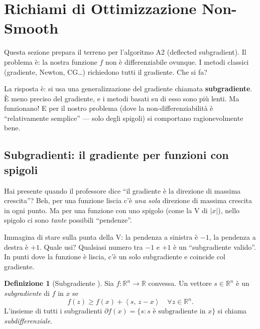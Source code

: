 \documentclass[a4paper,11pt]{article}
\theoremstyle{definition}
\newtheorem{definition}[theorem]{Definizione}
\newcommand{\R}{\mathbb{R}}
\newcommand{\inner}[2]{\left\langle #1,\, #2 \right\rangle}
\begin{document}
\section{Richiami di Ottimizzazione Non-Smooth}
\label{sec:nonsmooth_background}

\begin{intuizione}
Questa sezione prepara il terreno per l'algoritmo A2 (deflected subgradient). Il problema è: la nostra funzione $f$ non è differenziabile ovunque. I metodi classici (gradiente, Newton, CG\ldots) richiedono tutti il gradiente. Che si fa?

La risposta è: si usa una generalizzazione del gradiente chiamata \textbf{subgradiente}. È meno preciso del gradiente, e i metodi basati su di esso sono più lenti. Ma funzionano! E per il nostro problema (dove la non-differenziabilità è ``relativamente semplice'' --- solo degli spigoli) si comportano ragionevolmente bene.
\end{intuizione}

\subsection{Subgradienti: il gradiente per funzioni con spigoli}
\label{subsec:subgradients}

\begin{analogia}
Hai presente quando il professore dice ``il gradiente è la direzione di massima crescita''? Beh, per una funzione liscia c'è \emph{una sola} direzione di massima crescita in ogni punto. Ma per una funzione con uno spigolo (come la V di $|x|$), nello spigolo ci sono \emph{tante} possibili ``pendenze''.

Immagina di stare sulla punta della V: la pendenza a sinistra è $-1$, la pendenza a destra è $+1$. Quale usi? Qualsiasi numero tra $-1$ e $+1$ è un ``subgradiente valido''. In punti dove la funzione è liscia, c'è un solo subgradiente e coincide col gradiente.
\end{analogia}

\begin{definition}[Subgradiente {\cite[slide~5, set~5]{opt-slides}}]
Sia $f: \R^n \to \R$ convessa. Un vettore $s \in \R^n$ è un \emph{subgradiente} di $f$ in $x$ se
\[
  f(z) \geq f(x) + \inner{s}{z - x} \quad \forall z \in \R^n.
\]
L'insieme di tutti i subgradienti $\partial f(x) = \{s : s \text{ è subgradiente in } x\}$ si chiama \emph{subdifferenziale}.
\end{definition}
\end{document}
